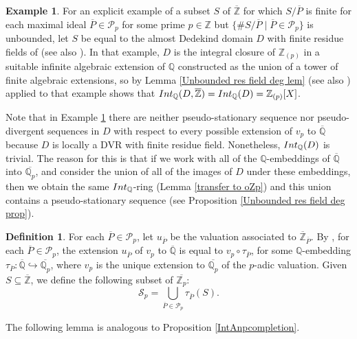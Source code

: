 \documentclass{article}
\theoremstyle{definition}\newtheorem{Def}[equation]{Definition}
\newtheorem{Ex}[equation]{Example}
\theoremstyle{definition}\newtheorem{Ques}[equation]{Question}
\theoremstyle{definition}\newtheorem{Conj}[equation]{Conjecture}
\theoremstyle{definition}\newtheorem{Not}[equation]{Notation}
\newcommand{\Q}{\mathbb{Q}}
\newcommand{\oQ}{\overline{\Q}}
\newcommand{\oZ}{\overline{\Z}}
\newcommand{\oP}{\overline{P}}
\newcommand{\Z}{\mathbb{Z}}
\newcommand{\oZp}{\overline{\Z_p}}
\newcommand{\oQp}{\overline{\Q_p}}
\newcommand{\Int}{\textnormal{Int}}
\newcommand{\IntQ}{\Int_{\Q}}
\newcommand{\rc}{ \color{red}}
\newcommand{\mcP}{\mathcal{P}}
\numberwithin{equation}{section}
\begin{document}
\begin{Ex}\label{Gilmer example}
For an explicit example of a subset $S$ of $\oZ$ for which $S/\oP$ is finite for each maximal ideal $\oP\in \mcP_p$ for some prime $p\in\Z$ but $\{\#S/\oP\mid\oP\in\mathcal{P}_p\}$ is unbounded, let $S$ be equal to the almost Dedekind domain $D$ with finite residue fields of \cite[Example 14]{GilmEx} (see also \cite[Example VI.4.18]{CaCh}). In that example, $D$ is the integral closure of $\Z_{(p)}$ in a suitable infinite algebraic extension of $\Q$ constructed as the union of a tower of finite algebraic extensions, so by Lemma \ref{Unbounded res field deg lem} (see also \cite[Lemma VI.4.2]{CaCh}) applied to that example shows that $\IntQ(D,\oZ)=\IntQ(D)=\Z_{(p)}[X]$.  
\end{Ex}

Note that in Example \ref{Gilmer example} there are neither pseudo-stationary sequence nor pseudo-divergent sequences in $D$ with respect to every possible extension of $v_p$ to $\oQ$ because $D$ is locally a DVR with finite residue field. Nonetheless, $\IntQ(D)$ is trivial. The reason for this is that if we work with all of the $\Q$-embeddings of $\oQ$ into $\oQp$, and consider the union of all of the images of $D$ under these embeddings, then we obtain the same $\IntQ$-ring (Lemma \ref{transfer to oZp}) and this union contains a pseudo-stationary sequence (see Proposition \ref{Unbounded res field deg prop}).

\begin{Def} 
For each $\oP \in \mcP_p$, let $u_{\oP}$ be the valuation associated to $\oZ_{\oP}$. By \cite[Chapter 2, \S 8, Theorem 8.1]{Neu}, for each $\oP\in\mathcal{P}_p$, the extension $u_{\oP}$ of $v_p$ to $\oQ$ is equal to $v_p\circ\tau_{\oP}$, for some $\Q$-embedding $\tau_{\oP}:\oQ\hookrightarrow\oQp$, where $v_p$ is the unique extension to $\oQp$ of the $p$-adic valuation. Given $S \subseteq \oZ$, we define the following subset of $\oZp$:
\begin{equation*}
\mathcal{S}_p=\bigcup_{\oP\in\mathcal{P}_p}\tau_{\oP}(S).
\end{equation*}
\end{Def}


The following lemma is analogous to Proposition \ref{IntAnpcompletion}.
\end{document}
